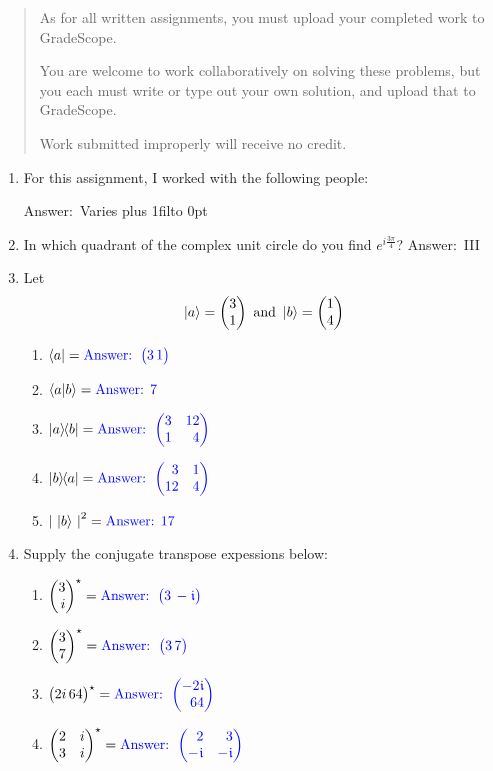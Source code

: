 \documentclass[12pt]{article}
\def\DefaultSpace{1in}
\newcommand{\LeaveSpace}[1][\DefaultSpace]{%
\vskip #1 plus 1fil\relax\hbox to 0pt{\hss} %
}
\begin{document}

\begin{quote}
    As for all written assignments, you must upload your completed work to GradeScope.

    You are welcome to work collaboratively on solving these problems, but you each must write or type out your own solution, and upload that to GradeScope.

    Work submitted improperly will receive no credit.
\end{quote}

\def\Ans#1{{\color{blue}\mbox{Answer: }#1}}
\begin{enumerate}[font=\bfseries]
    \item For this assignment, I worked with the following people:

    \Ans{Varies}
    \LeaveSpace{}
    \item {} In which quadrant of the complex unit circle do you find $e^{i\frac{3\pi}{4}}$? \Ans{III}
    \item {} Let
    \[ \ket{a} = \SQB{3}{1} \mbox{ and } \ket{b} = \SQB{1}{4} \]
    \begin{enumerate}[label=\theenumi.\arabic*]
        \item $\bra{a}=\Ans{\CQB{3}{1}}$
        \item $\braket{a|b}=\Ans{7}$
        \item $\ket{a}\kern-3pt\bra{b}=\Ans{\SQBG{\relax}{3}{12}{1}{4}}$
        \item $\ket{b}\kern-3pt\bra{a}=\Ans{\SQBG{\relax}{3}{1}{12}{4}}$
        \item $\Prob{\ket{b}}=\Ans{17}$
    \end{enumerate}


    \item {} Supply the conjugate transpose expessions below:
    \begin{enumerate}[label=\theenumi.\arabic*]
       \item $\Conj{\SQB{3}{i}}=\Ans{\CQB{3}{-\NiceI}}$ 
       \item $\Conj{\SQB{3}{7}}=\Ans{\CQB{3}{7}}$  
       \item $\Conj{\CQB{2i}{64}}=\Ans{\SQB{-2\NiceI}{64}}$
       \item $\Conj{\SQBG{\relax}{2}{i}{3}{i}}=\Ans{\SQBG{\relax}{2}{3}{-\NiceI}{-\NiceI}}$ 
    \end{enumerate}


\end{enumerate}
\end{document}
